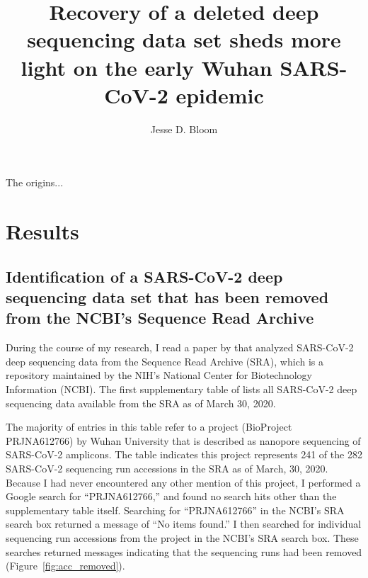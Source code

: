 \documentclass[9pt,twocolumn,twoside]{gsajnl_modified}
\title{Recovery of a deleted deep sequencing data set sheds more light on the early Wuhan SARS-CoV-2 epidemic}
\author[]{\Large Jesse D. Bloom}
\affil[]{Fred Hutchinson Cancer Research Center}
\affil[]{Howard Hughes Medical Institute}
\affil[]{Seattle, WA, USA}
\begin{document}
\maketitle
\thispagestyle{firststyle}
\firstpagefootnote

\vspace{-33pt}%

\lettrine[lines=2]{\color{color2}T}{}he origins... 

\section{Results}

\subsection{Identification of a SARS-CoV-2 deep sequencing data set that has been removed from the NCBI's Sequence Read Archive}
During the course of my research, I read a paper by \citet{farkas2020insights} that analyzed SARS-CoV-2 deep sequencing data from the Sequence Read Archive (SRA), which is a repository maintained by the NIH's National Center for Biotechnology Information (NCBI).
The first supplementary table of \citet{farkas2020insights} lists all SARS-CoV-2 deep sequencing data available from the SRA as of March 30, 2020.

The majority of entries in this table refer to a project (BioProject PRJNA612766) by Wuhan University that is described as nanopore sequencing of SARS-CoV-2 amplicons.
The table indicates this project represents 241 of the 282 SARS-CoV-2 sequencing run accessions in the SRA as of March, 30, 2020.
Because I had never encountered any other mention of this project, I performed a Google search for ``PRJNA612766,'' and found no search hits other than the supplementary table itself.
Searching for ``PRJNA612766'' in the NCBI's SRA search box returned a message of ``No items found.''
I then searched for individual sequencing run accessions from the project in the NCBI's SRA search box.
These searches returned messages indicating that the sequencing runs had been removed (Figure~\ref{fig:acc_removed}).
\end{document}
